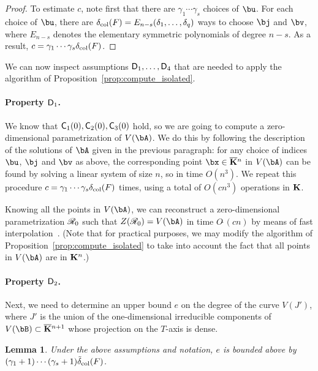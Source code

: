 \documentclass[12pt]{article}
\newtheorem{lemma}[definition]{Lemma}
\begin{document}
\begin{proof}
To estimate $c$, note first that there are $\gamma_1\cdots
\gamma_s$ choices of $\bu$. For each choice of $\bu$, there are
$\delta_{\rm col}({F})=E_{n-s}(\delta_1, \ldots, \delta_q)$ ways to
choose $\bj$ and $\bv$, where $E_{n-s}$ denotes the elementary
symmetric polynomials of degree $n-s$. As a result, $c=\gamma_1\cdots
\gamma_s \delta_{\rm col}({F})$.   
\end{proof}
We can now inspect assumptions $\mathsf{D}_1,\dots,\mathsf{D}_4$ that are needed
to apply the algorithm of Proposition~\ref{prop:compute_isolated}.

\paragraph{Property $\mathsf{D}_1$.} We know that $\mathsf{C}_1(0),\mathsf{C}_2(0),\mathsf{C}_3(0)$
hold, so we are going to compute a zero-dimensional parametrization of
$V(\bA)$.  We do this by following the description of the solutions of
$\bA$ given in the previous paragraph: for any choice of indices
$\bu$, $\bj$ and $\bv$ as above, the corresponding point $\bx \in
\KKbar{}^n$ in $V(\bA)$ can be found by solving a linear system of
size $n$, so in time $O(n^3)$. We repeat this procedure
$c=\gamma_1\cdots \gamma_s \delta_{\rm col}({F})$ times, using a total
of $O(c n^3)$ operations in $\mathbf{K}$.

Knowing all the points in $V(\bA)$, we can reconstruct a zero-dimensional
parametrization $\mathscr{R}_0$ such that $Z(\scrR_0)=V(\bA)$ in time
$O\tilde{~}(cn)$ by means of fast interpolation~\cite[Chapter~10]{GaGe03}.
(Note that for practical purposes, we may modify the algorithm
of Proposition~\ref{prop:compute_isolated} to take into account the
fact that all points in $V(\bA)$ are in $\mathbf{K}^n$.)

\paragraph{Property $\mathsf{D}_2$.} Next, we need to determine an upper bound 
$e$ on the degree of the curve $V(J')$, where $J'$ is the union of the
one-dimensional irreducible components of $V(\bB) \subset
\KKbar{}^{n+1}$ whose projection on the $T$-axis is dense.

\begin{lemma}\label{lemma:columndegree:e_estimate}
  Under the above assumptions and notation, $e$ is bounded above by
  $(\gamma_1+1)\cdots(\gamma_s+1) \tilde\delta_{\rm col}({F})$.
\end{lemma}
\end{document}
